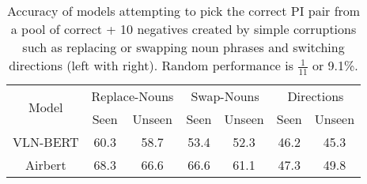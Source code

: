 \RequirePackage[dvipsnames,table]{xcolor} \documentclass[10pt,twocolumn,letterpaper]{article}
\newcommand{\vlnbert}{VLN-BERT}
\newcommand{\airbert}{Airbert}
\begin{document}
\begin{table}[t]
\centering
\small
\tabcolsep=0.08cm
\begin{tabular}{c cc cc cc}
\toprule
\multirow{2}{*}{Model} &
  \multicolumn{2}{c}{Replace-Nouns} &
  \multicolumn{2}{c}{Swap-Nouns} &
  \multicolumn{2}{c}{Directions} \\
& Seen & Unseen
  & Seen & Unseen
  & Seen & Unseen \\
\midrule
\vlnbert
    & 60.3 & 58.7
    & 53.4 & 52.3
    & 46.2 & 45.3 \\
    
\airbert
    & 68.3 & 66.6
    & 66.6 & 61.1
    & 47.3 & 49.8 \\
\bottomrule
\end{tabular}
\vspace{-2mm}
\caption{Accuracy of models attempting to pick the correct PI pair
from a pool of correct + 10 negatives created by simple corruptions such as replacing or swapping noun phrases and switching directions (left with right).
Random performance is $\frac{1}{11}$ or 9.1\%.}
\vspace{-2mm}
\label{tab:analysis}
\end{table}
\end{document}
